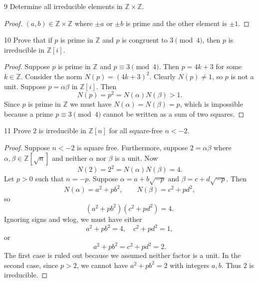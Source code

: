 \begin{problem}{9}
    Determine all irreducible elements in $\mathbb{Z} \times \mathbb{Z}$.
\end{problem}
\solved

\begin{proof}
    $(a, b) \in \mathbb{Z} \times \mathbb{Z}$ where $\pm a$ or $\pm b$ is prime
    and the other element is $\pm 1$.
\end{proof}

\begin{problem}{10}
    Prove that if $p$ is prime in $\mathbb{Z}$ and $p$ is congruent to $3 \pmod{4}$,
    then $p$ is irreducible in $\mathbb{Z}[i]$.
\end{problem}
\solved

\begin{proof}
    Suppose $p$ is prime in $\mathbb{Z}$ and $p \equiv 3 \pmod{4}$.
    Then $p = 4k + 3$ for some $k \in \mathbb{Z}$.
    Consider the norm $N(p) = (4k+3)^2$. 
    Clearly $N(p) \ne 1$, so $p$ is not a unit. 
    Suppose $p = \alpha \beta$ in $\mathbb{Z}[i]$.
    Then
    \[
        N(p) = p^2 = N(\alpha) N(\beta) > 1.
    \]
    Since $p$ is prime in $\mathbb{Z}$ we must have $N(\alpha) = N(\beta) = p$,
    which is impossible because a prime $p \equiv 3 \pmod 4$ cannot be written as a sum of two squares.
\end{proof}

\begin{problem}{11}
    Prove $2$ is irreducible in $\mathbb{Z}[n]$ for all square-free $n < -2$.
\end{problem}
\solved

\begin{proof}
    Suppose $n < -2$ is square free.
    Furthermore, suppose $2 = \alpha \beta$ where $\alpha, \beta \in \mathbb{Z}[\sqrt{n}]$ and neither $\alpha$ nor $\beta$ is a unit.
    Now 
    \[
        N(2) = 2^2 = N(\alpha) N(\beta) = 4.
    \]
    Let $p > 0$ such that $n = -p$. 
    Suppose $\alpha = a + b\sqrt{-p}$ and $\beta = c + d\sqrt{-p}$.
    Then 
    \[
        N(\alpha) = a^2 + p b^2, \qquad N(\beta) = c^2 + p d^2,
    \]
    so
    \[
        (a^2 + p b^2)(c^2 + p d^2) = 4.
    \]
    Ignoring signs and wlog, we must have either
    \[
        a^2 + p b^2 = 4, \quad c^2 + p d^2 = 1,
    \]
    or
    \[
        a^2 + p b^2 = c^2 + p d^2 = 2.
    \]
    The first case is ruled out because we assumed neither factor is a unit.  
    In the second case, since $p > 2$, we cannot have $a^2 + p b^2 = 2$ with integers $a,b$.
    Thus $2$ is irreducible.
\end{proof}

